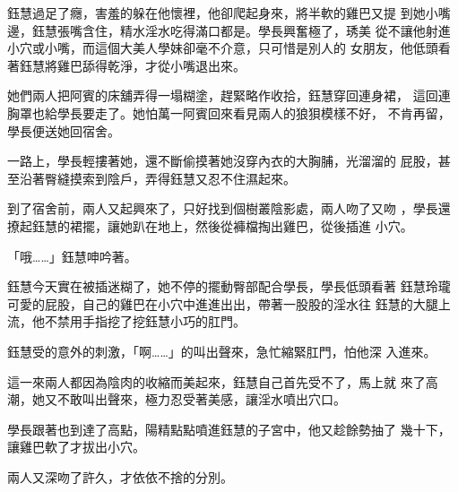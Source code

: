 鈺慧過足了癮，害羞的躲在他懷裡，他卻爬起身來，將半軟的雞巴又提
到她小嘴邊，鈺慧張嘴含住，精水淫水吃得滿口都是。學長興奮極了，琇美
從不讓他射進小穴或小嘴，而這個大美人學妹卻毫不介意，只可惜是別人的
女朋友，他低頭看著鈺慧將雞巴舔得乾淨，才從小嘴退出來。

她們兩人把阿賓的床舖弄得一塌糊塗，趕緊略作收拾，鈺慧穿回連身裙，
這回連胸罩也給學長要走了。她怕萬一阿賓回來看見兩人的狼狽模樣不好，
不肯再留，學長便送她回宿舍。

一路上，學長輕摟著她，還不斷偷摸著她沒穿內衣的大胸脯，光溜溜的
屁股，甚至沿著臀縫摸索到陰戶，弄得鈺慧又忍不住濕起來。

到了宿舍前，兩人又起興來了，只好找到個樹叢陰影處，兩人吻了又吻
，學長還撩起鈺慧的裙擺，讓她趴在地上，然後從褲檔掏出雞巴，從後插進
小穴。

「哦……」鈺慧呻吟著。

鈺慧今天實在被插迷糊了，她不停的擺動臀部配合學長，學長低頭看著
鈺慧玲瓏可愛的屁股，自己的雞巴在小穴中進進出出，帶著一股股的淫水往
鈺慧的大腿上流，他不禁用手指挖了挖鈺慧小巧的肛門。

鈺慧受的意外的刺激，「啊……」的叫出聲來，急忙縮緊肛門，怕他深
入進來。

這一來兩人都因為陰肉的收縮而美起來，鈺慧自己首先受不了，馬上就
來了高潮，她又不敢叫出聲來，極力忍受著美感，讓淫水噴出穴口。

學長跟著也到達了高點，陽精點點噴進鈺慧的子宮中，他又趁餘勢抽了
幾十下，讓雞巴軟了才拔出小穴。

兩人又深吻了許久，才依依不捨的分別。










